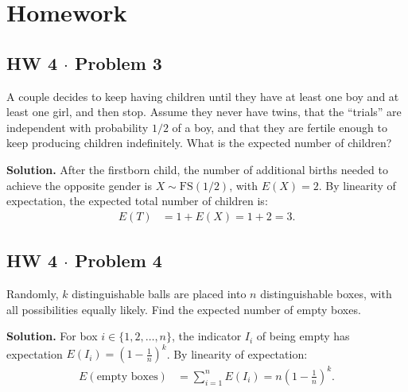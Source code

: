 \documentclass[11pt,a4paper]{article}
\begin{document}
\section{Homework}

\subsection{HW 4 $\cdot$ Problem 3}
\begin{tcolorbox}[title={HW 4 $\cdot$ Problem 3}]
A couple decides to keep having children until they have at least one boy and at least one girl, and then stop. Assume they never have twins, that the ``trials'' are independent with probability $1/2$ of a boy, and that they are fertile enough to keep producing children indefinitely. What is the expected number of children?
\end{tcolorbox}

\noindent \textbf{Solution.} After the firstborn child, the number of additional births needed to achieve the opposite gender is $X \sim \text{FS}(1/2)$, with $E(X) = 2$. By linearity of expectation, the expected total number of children is:
\begin{align*}
E(T) &= 1 + E(X) = 1 + 2 = 3.
\end{align*}

\vspace{10pt}
\subsection{HW 4 $\cdot$ Problem 4}
\begin{tcolorbox}[title={HW 4 $\cdot$ Problem 4}]
Randomly, $k$ distinguishable balls are placed into $n$ distinguishable boxes, with all possibilities equally likely. Find the expected number of empty boxes.
\end{tcolorbox}

\noindent \textbf{Solution.} For box $i \in \{1, 2, \dots, n\}$, the indicator $I_i$ of being empty has expectation $E(I_i) = \left(1 - \frac{1}{n}\right)^k$. By linearity of expectation:
\begin{align*}
E(\text{empty boxes}) &= \sum_{i=1}^{n} E(I_i) = n \left(1 - \frac{1}{n}\right)^k.
\end{align*}

\vspace{10pt}
\end{document}
